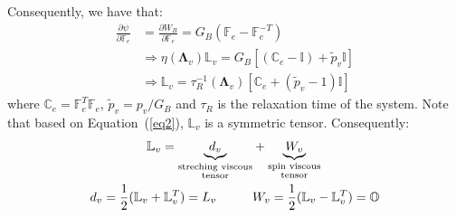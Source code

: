 \documentclass[12pt]{extarticle}
\newcommand{\F}{\ensuremath{\mathbb{F}}}
\newcommand{\LL}{\ensuremath{\mathbb{L}}}
\begin{document}
Consequently, we have that:
\begin{equation}
\begin{aligned}
\frac{\partial \psi}{\partial \F_e}&=\frac{\partial W_B}{\partial \F_e}= G_B (\F_e-\F_e^{-T})\\%
&\Longrightarrow
\eta(\boldsymbol{\Lambda}_v)\LL_v=G_B \left[\left(\mathbb{C}_e-\mathbb{I}\right)+\tilde{p}_v\mathbb{I}\right]\\
&\Longrightarrow \LL_v= \tau_R^{-1}(\boldsymbol{\Lambda}_v) \left[\mathbb{C}_e+(\tilde{p}_v-1)\mathbb{I}\right]
\end{aligned}
\label{eq2}
\end{equation} 
where $\mathbb{C}_e=\F_e^T\F_e$, $\tilde{p}_v=p_v/G_B$ and $\tau_R$ is the relaxation time of the system. Note that based on Equation~(\ref{eq2}), $\LL_v$ is a symmetric tensor. Consequently:
\begin{equation}
\begin{aligned}
\LL_v = \underbrace{d_v}_{\substack{\text{streching viscous} \\ \text{tensor}}}& +\underbrace{W_v}_{\substack{\text{spin viscous} \\ \text{tensor}}} \\
d_v=\frac{1}{2} (\LL_v+\LL_v^T)=L_v\hspace{10mm}& W_v=\frac{1}{2} (\LL_v-\LL_v^T)= \mathbb{O}
\end{aligned}
\end{equation}
\end{document}
